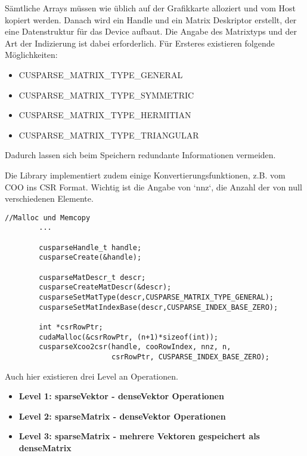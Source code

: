 		Sämtliche Arrays müssen wie üblich auf der Grafikkarte alloziert und vom Host kopiert werden. Danach wird ein \gls{Handle} und ein Matrix Deskriptor erstellt, der eine Datenstruktur für das Device aufbaut. Die Angabe des Matrixtyps und der Art der Indizierung ist dabei erforderlich. Für Ersteres existieren folgende Möglichkeiten:
		\begin{itemize}
			\item CUSPARSE{\_}MATRIX{\_}TYPE{\_}GENERAL
			\item CUSPARSE{\_}MATRIX{\_}TYPE{\_}SYMMETRIC
			\item CUSPARSE{\_}MATRIX{\_}TYPE{\_}HERMITIAN
			\item CUSPARSE{\_}MATRIX{\_}TYPE{\_}TRIANGULAR
		\end{itemize}

		Dadurch lassen sich beim Speichern redundante Informationen vermeiden.

		Die Library implementiert zudem einige Konvertierungsfunktionen, z.B. vom COO ins CSR Format. Wichtig ist die Angabe von \li`nnz`, die Anzahl der von null verschiedenen Elemente.

		\newpage		
		
		\begin{lstlisting}[caption=cuSPARSE: Initialisierung und Konvertierung]
		//Malloc und Memcopy
		...

		cusparseHandle_t handle;
		cusparseCreate(&handle);

		cusparseMatDescr_t descr;
		cusparseCreateMatDescr(&descr);
		cusparseSetMatType(descr,CUSPARSE_MATRIX_TYPE_GENERAL);
		cusparseSetMatIndexBase(descr,CUSPARSE_INDEX_BASE_ZERO);
    
		int *csrRowPtr; 
		cudaMalloc(&csrRowPtr, (n+1)*sizeof(int));
		cusparseXcoo2csr(handle, cooRowIndex, nnz, n, 
		                 csrRowPtr, CUSPARSE_INDEX_BASE_ZERO);
		\end{lstlisting}

		Auch hier existieren drei Level an Operationen.
		\begin{itemize}
			\item \textbf{Level 1: sparseVektor - denseVektor Operationen}\\
			\item \textbf{Level 2: sparseMatrix - denseVektor Operationen}\\
			\item \textbf{Level 3: sparseMatrix - mehrere Vektoren gespeichert als denseMatrix}
		\end{itemize}
		
